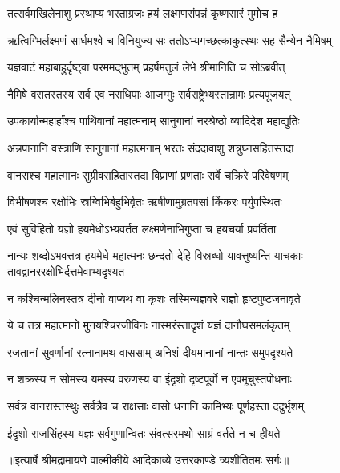\twolineshloka
{तत्सर्वमखिलेनाशु प्रस्थाप्य भरताग्रजः}
{हयं लक्ष्मणसंपन्नं कृष्णसारं मुमोच ह} %

\twolineshloka
{ऋत्विग्भिर्लक्ष्मणं सार्धमश्वे च विनियुज्य सः}
{ततोऽभ्यगच्छत्काकुत्स्थः सह सैन्येन नैमिषम्} %

\twolineshloka
{यज्ञवाटं महाबाहुर्दृष्ट्वा परममद्भुतम्}
{प्रहर्षमतुलं लेभे श्रीमानिति च सोऽब्रवीत्} %

\twolineshloka
{नैमिषे वसतस्तस्य सर्व एव नराधिपाः}
{आजग्मुः सर्वराष्ट्रेभ्यस्तान्रामः प्रत्यपूजयत्} %

\twolineshloka
{उपकार्यान्महार्हांश्च पार्थिवानां महात्मनाम्}
{सानुगानां नरश्रेष्ठो व्यादिदेश महाद्युतिः} %

\twolineshloka
{अन्नपानानि वस्त्राणि सानुगानां महात्मनाम्}
{भरतः संददावाशु शत्रुघ्नसहितस्तदा} %

\twolineshloka
{वानराश्च महात्मानः सुग्रीवसहितास्तदा}
{विप्राणां प्रणताः सर्वे चक्रिरे परिवेषणम्} %

\twolineshloka
{विभीषणश्च रक्षोभिः स्रग्विभिर्बहुभिर्वृतः}
{ऋषीणामुग्रतपसां किंकरः पर्युपस्थितः} %

\twolineshloka
{एवं सुविहितो यज्ञो हयमेधोऽभ्यवर्तत}
{लक्ष्मणेनाभिगुप्ता च हयचर्या प्रवर्तिता} %

\threelineshloka
{नान्यः शब्दोऽभवत्तत्र हयमेधे महात्मनः}
{छन्दतो देहि विस्रब्धो यावत्तुष्यन्ति याचकाः}
{तावद्वानररक्षोभिर्दत्तमेवाभ्यदृश्यत} %

\twolineshloka
{न कश्चिन्मलिनस्तत्र दीनो वाप्यथ वा कृशः}
{तस्मिन्यज्ञवरे राज्ञो हृष्टपुष्टजनावृते} %

\twolineshloka
{ये च तत्र महात्मानो मुनयश्चिरजीविनः}
{नास्मरंस्तादृशं यज्ञं दानौघसमलंकृतम्} %

\twolineshloka
{रजतानां सुवर्णानां रत्नानामथ वाससाम्}
{अनिशं दीयमानानां नान्तः समुपदृश्यते} %

\twolineshloka
{न शक्रस्य न सोमस्य यमस्य वरुणस्य वा}
{ईदृशो दृष्टपूर्वो न एवमूचुस्तपोधनाः} %

\twolineshloka
{सर्वत्र वानरास्तस्थुः सर्वत्रैव च राक्षसाः}
{वासो धनानि कामिभ्यः पूर्णहस्ता ददुर्भृशम्} %

\twolineshloka
{ईदृशो राजसिंहस्य यज्ञः सर्वगुणान्वितः}
{संवत्सरमथो साग्रं वर्तते न च हीयते} %


{॥इत्यार्षे श्रीमद्रामायणे वाल्मीकीये आदिकाव्ये उत्तरकाण्डे त्र्यशीतितमः सर्गः॥}


